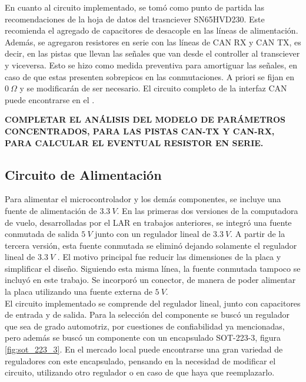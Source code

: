 En cuanto al circuito implementado, se tomó como punto de partida las recomendaciones de la hoja de datos del trasnciever SN65HVD230. Este recomienda el agregado de capacitores de desacople en las líneas de alimentación. Además, se agregaron resistores en serie con las líneas de CAN RX y CAN TX, es decir, en las pistas que llevan las señales que van desde el controller al transciever y viceversa. Esto se hizo como medida preventiva para amortiguar las señales, en caso de que estas presenten sobrepicos en las conmutaciones. A priori se fijan en $0 \ \Omega$ y se modificarán de ser necesario. El circuito completo de la interfaz CAN puede encontrarse en el .

\textbf{{\color{red} COMPLETAR EL ANÁLISIS DEL MODELO DE PARÁMETROS CONCENTRADOS, PARA LAS PISTAS CAN-TX Y CAN-RX, PARA CALCULAR EL EVENTUAL RESISTOR EN SERIE.}}

\subsection{Circuito de Alimentación}

Para alimentar el microcontrolador y los demás componentes, se incluye una fuente de alimentación de $3.3 \ V$. En las primeras dos versiones de la computadora de vuelo, desarrolladas por el LAR en trabajos anteriores, se integró una fuente conmutada de salida $5 \ V$ junto con un regulador lineal de $3.3 \ V$. A partir de la tercera versión, esta fuente conmutada se eliminó dejando solamente el regulador lineal de $3.3 \ V$ \cite{garberoglio2019diseno}. El motivo principal fue reducir las dimensiones de la placa y simplificar el diseño. Siguiendo esta misma línea, la fuente conmutada tampoco se incluyó en este trabajo. Se incorporó un conector, de manera de poder alimentar la placa utilizando una fuente externa de $5 \ V$.\\

El circuito implementado se comprende del regulador lineal, junto con capacitores de entrada y de salida. Para la selección del componente se buscó un regulador que sea de grado automotriz, por cuestiones de confiabilidad ya mencionadas, pero además se buscó un componente con un encapsulado SOT-223-3, figura \ref{fig:sot_223_3}. En el mercado local puede encontrarse una gran variedad de reguladores con este encapsulado, pensando en la necesidad de modificar el circuito, utilizando otro regulador o en caso de que haya que reemplazarlo.\\

